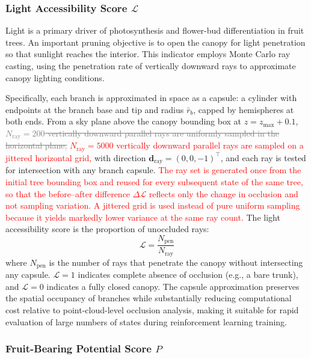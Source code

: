 \documentclass[12pt,a4paper,fontset=fandol]{ctexart}
\newcommand{\old}[1]{\textcolor{gray}{\sout{#1}}}
\newcommand{\rev}[1]{\textcolor{red}{#1}}
\newcommand{\rb}{\bar{r}_b}
\begin{document}
\subsubsection{Light Accessibility Score $\mathcal{L}$}

Light is a primary driver of photosynthesis and flower-bud differentiation in fruit trees.
An important pruning objective is to open the canopy for light penetration so that sunlight reaches the interior.
This indicator employs Monte Carlo ray casting,
using the penetration rate of vertically downward rays to approximate canopy lighting conditions.

Specifically, each branch is approximated in space as a capsule:
a cylinder with endpoints at the branch base and tip and radius $\rb$, capped by hemispheres at both ends.
From a sky plane above the canopy bounding box at $z = z_{\max} + 0.1$,
\old{$N_{\text{ray}} = 200$ vertically downward parallel rays are uniformly sampled in the horizontal plane,}
\rev{$N_{\text{ray}} = 5000$ vertically downward parallel rays are sampled on a jittered horizontal grid,}
with direction $\mathbf{d}_{\text{ray}} = (0, 0, -1)^{\!\top}$,
and each ray is tested for intersection with any branch capsule.
\rev{The ray set is generated once from the initial tree bounding box and reused for every subsequent state of the same tree, so that the before--after difference $\Delta\mathcal{L}$ reflects only the change in occlusion and not sampling variation.}
\rev{A jittered grid is used instead of pure uniform sampling because it yields markedly lower variance at the same ray count.}
The light accessibility score is the proportion of unoccluded rays:
\begin{equation}\label{eq:light}
  \mathcal{L} = \frac{N_{\text{pen}}}{N_{\text{ray}}}
\end{equation}
where $N_{\text{pen}}$ is the number of rays that penetrate the canopy without intersecting any capsule.
$\mathcal{L} = 1$ indicates complete absence of occlusion (e.g., a bare trunk), and $\mathcal{L} = 0$ indicates a fully closed canopy.
The capsule approximation preserves the spatial occupancy of branches
while substantially reducing computational cost relative to point-cloud-level occlusion analysis,
making it suitable for rapid evaluation of large numbers of states during reinforcement learning training.

\subsubsection{Fruit-Bearing Potential Score $P$}
\end{document}
